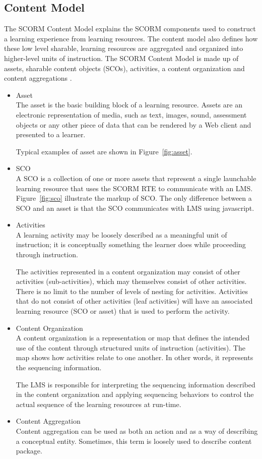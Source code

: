 \subsection{Content Model}
The SCORM Content Model explains the SCORM components used to construct a learning experience from learning resources. The content model also defines 
how these low level sharable, learning resources are aggregated and organized into higher-level units of instruction. The SCORM Content Model is made 
up of assets, sharable content objects (SCOs), activities, a content organization and content aggregations \cite{cambook}.
\begin{itemize}
	\item Asset \\
		The asset is the basic building block of a learning resource. Assets are an electronic representation of media, such as text, images, sound, 
		assessment objects or any other piece of data that can be rendered by a Web client and presented to a learner.

		Typical examples of asset are shown in Figure~\ref{fig:asset}.
	\item SCO \\
		A SCO is a collection of one or more assets that represent a single launchable learning resource that uses the SCORM RTE to communicate with 
		an LMS. Figure~\ref{fig:sco} illustrate the markup of SCO. The only difference between a SCO and an asset is that the SCO communicates with 
		LMS using javascript.
	\item Activities \\
		A learning activity may be loosely described as a meaningful unit of instruction; it is conceptually something the learner does while 
		proceeding through instruction.

		The activities represented in a content organization may consist of other activities (sub-activities), which may themselves consist of other 
		activities. There is no limit to the number of levels of nesting for activities. Activities that do not consist of other activities (leaf 
		activities) will have an associated learning resource (SCO or asset) that is used to perform the activity.
	\item Content Organization \\
		A content organization is a representation or map that defines the intended use of the content through structured units of instruction 
		(activities). The map shows how activities relate to one another. In other words, it represents the sequencing information.

		The LMS is responsible for interpreting the sequencing information described in the content organization and applying sequencing behaviors to 
		control the actual sequence of the learning resources at run-time.
	\item Content Aggregation \\
		Content aggregation can be used as both an action and as a way of describing a conceptual entity. Sometimes, this term is loosely used to 
		describe content package.
\end{itemize}
